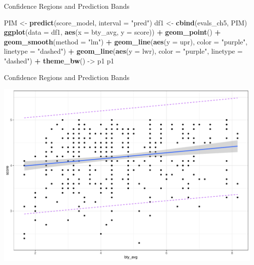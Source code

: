 \documentclass[
  ignorenonframetext,
]{beamer}
\newenvironment{Shaded}{\begin{snugshade}}{\end{snugshade}}
\newcommand{\AttributeTok}[1]{\textcolor[rgb]{0.13,0.29,0.53}{#1}}
\newcommand{\FunctionTok}[1]{\textcolor[rgb]{0.13,0.29,0.53}{\textbf{#1}}}
\newcommand{\NormalTok}[1]{#1}
\newcommand{\OtherTok}[1]{\textcolor[rgb]{0.56,0.35,0.01}{#1}}
\newcommand{\SpecialCharTok}[1]{\textcolor[rgb]{0.81,0.36,0.00}{\textbf{#1}}}
\newcommand{\StringTok}[1]{\textcolor[rgb]{0.31,0.60,0.02}{#1}}
\begin{document}
\begin{frame}[fragile]{Confidence Regions and Prediction Bands}
\protect\hypertarget{confidence-regions-and-prediction-bands}{}
\begin{Shaded}
\begin{Highlighting}[]
\NormalTok{PIM }\OtherTok{\textless{}{-}} \FunctionTok{predict}\NormalTok{(score\_model, }\AttributeTok{interval =} \StringTok{"pred"}\NormalTok{)}
\NormalTok{df1 }\OtherTok{\textless{}{-}} \FunctionTok{cbind}\NormalTok{(evals\_ch5, PIM)}
\FunctionTok{ggplot}\NormalTok{(}\AttributeTok{data =}\NormalTok{ df1, }\FunctionTok{aes}\NormalTok{(}\AttributeTok{x =}\NormalTok{ bty\_avg, }\AttributeTok{y =}\NormalTok{ score)) }\SpecialCharTok{+} 
  \FunctionTok{geom\_point}\NormalTok{() }\SpecialCharTok{+} 
  \FunctionTok{geom\_smooth}\NormalTok{(}\AttributeTok{method =} \StringTok{"lm"}\NormalTok{) }\SpecialCharTok{+} 
  \FunctionTok{geom\_line}\NormalTok{(}\FunctionTok{aes}\NormalTok{(}\AttributeTok{y =}\NormalTok{ upr), }\AttributeTok{color =} \StringTok{"purple"}\NormalTok{, }
            \AttributeTok{linetype =} \StringTok{"dashed"}\NormalTok{) }\SpecialCharTok{+} 
  \FunctionTok{geom\_line}\NormalTok{(}\FunctionTok{aes}\NormalTok{(}\AttributeTok{y =}\NormalTok{ lwr), }\AttributeTok{color =} \StringTok{"purple"}\NormalTok{, }
            \AttributeTok{linetype =} \StringTok{"dashed"}\NormalTok{) }\SpecialCharTok{+} 
  \FunctionTok{theme\_bw}\NormalTok{() }\OtherTok{{-}\textgreater{}}\NormalTok{ p1}
\NormalTok{p1}
\end{Highlighting}
\end{Shaded}
\end{frame}

\begin{frame}{Confidence Regions and Prediction Bands}
\protect\hypertarget{confidence-regions-and-prediction-bands-1}{}
\begin{center}\includegraphics[width=0.7\linewidth,height=0.7\textheight]{Week4_Lect_files/figure-beamer/unnamed-chunk-40-1} \end{center}
\end{frame}
\end{document}
